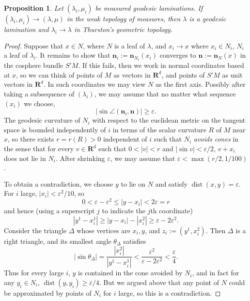 \documentclass[reqno,11pt]{amsart}
\newcommand{\RR}{\mathbf{R}}
\DeclareMathOperator{\dist}{dist}
\newcommand{\normal}{\mathbf n}
\newcommand{\dfn}[1]{\emph{#1}\index{#1}}
\newtheorem{proposition}[theorem]{Proposition}
\theoremstyle{definition}
\numberwithin{equation}{section}
\begin{document}
\begin{proposition}\label{measured implies Thurston}
Let $(\lambda_i, \mu_i)$ be measured geodesic laminations.
If $(\lambda_i, \mu_i) \to (\lambda, \mu)$ in the weak topology of measures, then $\lambda$ is a geodesic lamination and $\lambda_i \to \lambda$ in Thurston's geometric topology.
\end{proposition}
\begin{proof}
Suppose that $x \in N$, where $N$ is a leaf of $\lambda$, and $x_i \to x$ where $x_i \in N_i$, $N_i$ a leaf of $\lambda_i$.
It remains to show that $\normal_i := \normal_{N_i}(x_i)$ converges to $\normal := \normal_N(x)$ in the cosphere bundle $S'M$.
If this fails, then we work in normal coordinates based at $x$, so we can think of points of $M$ as vectors in $\RR^d$, and points of $S'M$ as unit vectors in $\RR^d$.
In such coordinates we may view $N$ as the first axis.
Possibly after taking a subsequence of $(\lambda_i)$, we may assume that no matter what sequence $(x_i)$ we choose,
$$|\sin \angle(\normal_i, \normal)| \geq \varepsilon.$$
The geodesic curvature of $N_i$ with respect to the euclidean metric on the tangent space is bounded independently of $i$ in terms of the scalar curvature $R$ of $M$ near $x$, so there exists $r = r(R) > 0$ independent of $i$ such that $N_i$ \dfn{avoids cones} in the sense that for every $v \in \RR^d$ such that $0 < |v| < r$ and $|\sin v| < \varepsilon/2$, $v + x_i$ does not lie in $N_i$.
After shrinking $\varepsilon$, we may assume that $\varepsilon < \max(r/2, 1/100)$.

To obtain a contradiction, we choose $y$ to lie on $N$ and satisfy $\dist(x, y) = \varepsilon$.
For $i$ large, $|x_i| < \varepsilon^2/10$, so
$$0 < \varepsilon - \varepsilon^2 \leq |y - x_i| < 2\varepsilon = r$$
and hence (using a superscript $j$ to indicate the $j$th coordinate)
$$|y^1 - x_i^1| \geq |y - x_i| - |x_i^2| \geq \varepsilon - 2\varepsilon^2.$$
Consider the triangle $\Delta$ whose vertices are $x_i, y$, and $z_i := (y^1, x_i^2)$.
Then $\Delta$ is a right triangle, and its smallest angle $\theta_\Delta$ satisfies
$$|\sin \theta_\Delta| = \frac{|x_i^2|}{|y^1 - x_i^1|} < \frac{\varepsilon^2}{\varepsilon - 2\varepsilon^2} < \frac{\varepsilon}{4}.$$
Thus for every large $i$, $y$ is contained in the cone avoided by $N_i$, and in fact for any $y_i \in N_i$, $\dist(y, y_i) \geq \varepsilon/4$.
But we argued above that any point of $N$ could be approximated by points of $N_i$ for $i$ large, so this is a contradiction.
\end{proof}
\end{document}
